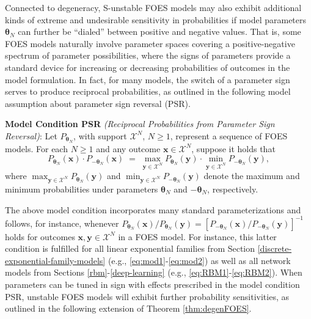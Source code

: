 \documentclass[numbib]{imamat}
\theoremstyle{theorem}
\theoremstyle{lemma}
\theoremstyle{example}
\theoremstyle{corollary}
\theoremstyle{definition}
\theoremstyle{remark}
\theoremstyle{approximation}
\theoremstyle{scheme}
\begin{document}
Connected to degeneracy, S-unstable FOES models may also exhibit
additional kinds of extreme and undesirable sensitivity in probabilities
if model parameters \(\boldsymbol \theta_N\) can further be ``dialed''
between positive and negative values. That is, some FOES models
naturally involve parameter spaces covering a positive-negative spectrum
of parameter possibilities, where the signs of parameters provide a
standard device for increasing or decreasing probabilities of outcomes
in the model formulation. In fact, for many models, the switch of a
parameter sign serves to produce reciprocal probabilities, as outlined
in the following model assumption about parameter sign reversal (PSR).

\textbf{Model Condition PSR} \emph{(Reciprocal Probabilities from
Parameter Sign Reversal)}: Let \(P_{\boldsymbol \theta_N}\), with
support \(\mathcal{X}^N\), \(N\geq 1\), represent a sequence of FOES
models. For each \(N \geq 1\) and any outcome
\(\boldsymbol x \in \mathcal{X}^N\), suppose it holds that \[
P_{\boldsymbol \theta_N}(\boldsymbol x)  \cdot P_{-\boldsymbol \theta_N}(\boldsymbol x) \;=\;   \max\limits_{\boldsymbol y \in \mathcal{X}^N}P_{ \boldsymbol \theta_N}(\boldsymbol y)\cdot \min\limits_{\boldsymbol y \in \mathcal{X}^N}P_{-\boldsymbol \theta_N}(\boldsymbol y),
\] where
\(\max_{\boldsymbol y \in \mathcal{X}^N}P_{ \boldsymbol \theta_N}(\boldsymbol y)\)
and
\(\min_{\boldsymbol y \in \mathcal{X}^N}P_{-\boldsymbol \theta_N}(\boldsymbol y)\)
denote the maximum and minimum probabilities under parameters
\(\boldsymbol \theta_N\) and \(-\boldsymbol \theta_N\), respectively.

The above model condition incorporates many standard parameterizations
and follows, for instance, whenever
\(P_{\boldsymbol \theta_N}(\boldsymbol x)/P_{\boldsymbol \theta_N}(\boldsymbol y) = [P_{-\boldsymbol \theta_N}(\boldsymbol x)/P_{-\boldsymbol \theta_N}(\boldsymbol y)]^{-1}\)
holds for outcomes \(\boldsymbol x, \boldsymbol y \in\mathcal{X}^N\) in
a FOES model. For instance, this latter condition is fulfilled for all
linear exponential families from Section
\ref{discrete-exponential-family-models} (e.g.,
\eqref{eq:mod1}-\eqref{eq:mod2}) as well as all network models from Sections
\ref{rbm}-\ref{deep-learning} (e.g., \eqref{eq:RBM1}-\eqref{eq:RBM2}). When
parameters can be tuned in sign with effects prescribed in the model
condition PSR, unstable FOES models will exhibit further probability
sensitivities, as outlined in the following extension of Theorem
\ref{thm:degenFOES}.
\end{document}
